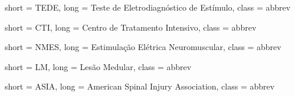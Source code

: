  {
	short = TEDE,
	long = Teste de Eletrodiagnóstico de Estímulo,
	class = abbrev
}

 {
	short = CTI,
	long = Centro de Tratamento Intensivo,
	class = abbrev
}

 {
	short = NMES,
	long =  Estimulação Elétrica Neuromuscular,
	class = abbrev
}

 {
	short = LM,
	long =  Lesão Medular,
	class = abbrev
}

 {
	short = ASIA,
	long =  American Spinal Injury Association,
	class = abbrev
}